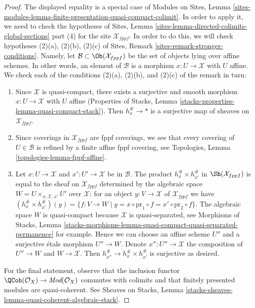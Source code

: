 \begin{proof}
The displayed equality is a special case of Modules on Sites, Lemma
\ref{sites-modules-lemma-finite-presentation-quasi-compact-colimit}.
In order to apply it, we need to check the hypotheses of
Sites, Lemma \ref{sites-lemma-directed-colimits-global-sections} part (4)
for the site $\mathcal{X}_{fppf}$. In order to do this, we will check
hypotheses (2)(a), (2)(b), (2)(c) of
Sites, Remark \ref{sites-remark-stronger-conditions}.
Namely, let $\mathcal{B} \subset \Ob(\mathcal{X}_{fppf})$ be the set
of objects lying over affine schemes. In other words, an element
of $\mathcal{B}$ is a morphism $x : U \to \mathcal{X}$ with $U$ affine.
We check each of the conditions (2)(a), (2)(b), and (2)(c)
of the remark in turn:
\begin{enumerate}
\item Since $\mathcal{X}$ is quasi-compact, there exists a
surjective and smooth morphism $x : U \to \mathcal{X}$ with $U$ affine
(Properties of Stacks, Lemma
\ref{stacks-properties-lemma-quasi-compact-stack}).
Then $h_x^\# \to *$ is a surjective map of sheaves on $\mathcal{X}_{fppf}$.
\item Since coverings in $\mathcal{X}_{fppf}$ are fppf
coverings, we see that every covering of $U \in \mathcal{B}$ is refined
by a finite affine fppf covering, see
Topologies, Lemma \ref{topologies-lemma-fppf-affine}.
\item Let $x : U \to \mathcal{X}$ and $x' : U' \to \mathcal{X}$ be
in $\mathcal{B}$. The product $h_x^\# \times h_{x'}^\#$ in
$\Sh(\mathcal{X}_{fppf})$ is equal to the sheaf on $\mathcal{X}_{fppf}$
determined by the algebraic space $W = U \times_{x, \mathcal{X}, x'} U'$ over
$\mathcal{X}$: for an object $y : V \to \mathcal{X}$ of
$\mathcal{X}_{fppf}$ we have
$(h_x^\# \times h_{x'}^\#)(y) = \{f : V \to W \mid y =
x \circ \text{pr}_1 \circ f = x' \circ \text{pr}_2 \circ f\}$.
The algebraic space $W$ is quasi-compact because $\mathcal{X}$
is quasi-separated, see Morphisms of Stacks, Lemma
\ref{stacks-morphisms-lemma-quasi-compact-quasi-separated-permanence}
for example. Hence we can choose an affine scheme $U''$ and
a surjective \'etale morphism $U'' \to W$. Denote $x'' : U'' \to \mathcal{X}$
the composition of $U'' \to W$ and $W \to \mathcal{X}$. Then
$h_{x''}^\# \to h_x^\# \times h_{x'}^\#$ is surjective as desired.
\end{enumerate}
For the final statement, observe that the inclusion functor
$\QCoh(\mathcal{O}_X) \to \textit{Mod}(\mathcal{O}_X)$
commutes with colimits and that finitely presented modules
are quasi-coherent. See Sheaves on Stacks, Lemma
\ref{stacks-sheaves-lemma-quasi-coherent-algebraic-stack}.
\end{proof}

